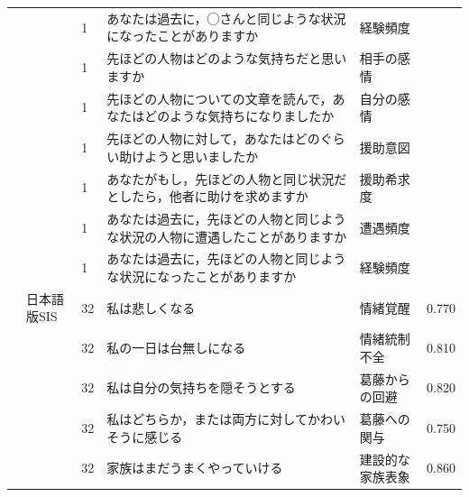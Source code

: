 \begin{landscape}
\begin{longtable}{p{2cm}p{2cm}p{2cm}p{6cm}p{2cm}p{2cm}}
                                 &                                  & 1   & あなたは過去に，◯さんと同じような状況になったことがありますか                     & 経験頻度                 &         \\
                                 &                                  & 1   & 先ほどの人物はどのような気持ちだと思いますか                              & 相手の感情                &         \\
                                 &                                  & 1   & 先ほどの人物についての文章を読んで，あなたはどのような気持ちになりましたか               & 自分の感情                &         \\
                                 &                                  & 1   & 先ほどの人物に対して，あなたはどのぐらい助けようと思いましたか                     & 援助意図                 &         \\
                                 &                                  & 1   & あなたがもし，先ほどの人物と同じ状況だとしたら，他者に助けを求めますか                 & 援助希求度                &         \\
                                 &                                  & 1   & あなたは過去に，先ほどの人物と同じような状況の人物に遭遇したことがありますか              & 遭遇頻度                 &         \\
                                 &                                  & 1   & あなたは過去に，先ほどの人物と同じような状況になったことがありますか                  & 経験頻度                 &         \\
        \citet{Hirose202192}     & 日本語版SIS                          & 32  & 私は悲しくなる                                             & 情緒覚醒                 & 0.770   \\
                                 &                                  & 32  & 私の一日は台無しになる                                         & 情緒統制不全               & 0.810   \\
                                 &                                  & 32  & 私は自分の気持ちを隠そうとする                                     & 葛藤からの回避              & 0.820   \\
                                 &                                  & 32  & 私はどちらか，または両方に対してかわいそうに感じる                           & 葛藤への関与               & 0.750   \\
                                 &                                  & 32  & 家族はまだうまくやっていける                                      & 建設的な家族表象             & 0.860   \\

\end{longtable}
\end{landscape}
